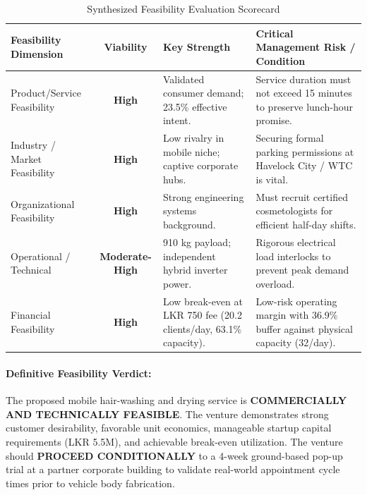 \begin{table}[htbp]
\centering
\small
\caption{Synthesized Feasibility Evaluation Scorecard}
\label{tab:feasibility_scorecard}
\begin{tabularx}{\textwidth}{L{0.24\textwidth}cL{0.24\textwidth}Y}
\toprule
\textbf{Feasibility Dimension} & \textbf{Viability} & \textbf{Key Strength} & \textbf{Critical Management Risk / Condition} \\
\midrule
Product/Service Feasibility & \textbf{High} & Validated consumer demand; 23.5\% effective intent. & Service duration must not exceed 15 minutes to preserve lunch-hour promise. \\
\addlinespace
Industry / Market Feasibility & \textbf{High} & Low rivalry in mobile niche; captive corporate hubs. & Securing formal parking permissions at Havelock City / WTC is vital. \\
\addlinespace
Organizational Feasibility & \textbf{High} & Strong engineering systems background. & Must recruit certified cosmetologists for efficient half-day shifts. \\
\addlinespace
Operational / Technical & \textbf{Moderate-High} & 910 kg payload; independent hybrid inverter power. & Rigorous electrical load interlocks to prevent peak demand overload. \\
\addlinespace
Financial Feasibility & \textbf{High} & Low break-even at LKR 750 fee (20.2 clients/day, 63.1\% capacity). & Low-risk operating margin with 36.9\% buffer against physical capacity (32/day). \\
\bottomrule
\end{tabularx}
\end{table}

\paragraph{Definitive Feasibility Verdict:}
The proposed mobile hair-washing and drying service is \textbf{COMMERCIALLY AND TECHNICALLY FEASIBLE}. The venture demonstrates strong customer desirability, favorable unit economics, manageable startup capital requirements (LKR 5.5M), and achievable break-even utilization. The venture should \textbf{PROCEED CONDITIONALLY} to a 4-week ground-based pop-up trial at a partner corporate building to validate real-world appointment cycle times prior to vehicle body fabrication.

